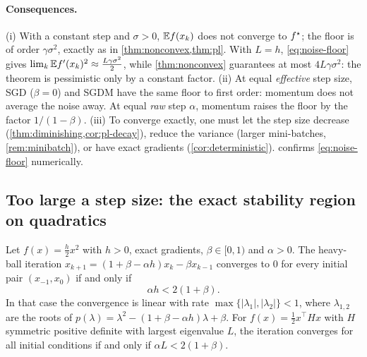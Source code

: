 \paragraph{Consequences.}
(i) With a constant step and $\sigma>0$, $\mathbb{E} f(x_k)$ does not converge to $f^\star$; the floor is
of order $\gamma\sigma^2$, exactly as in \cref{thm:nonconvex,thm:pl}. With $L=h$,
\eqref{eq:noise-floor} gives $\lim_k\mathbb{E} f'(x_k)^2\approx\frac{L\gamma\sigma^2}{2}$, while
\cref{thm:nonconvex} guarantees at most $4L\gamma\sigma^2$: the theorem is pessimistic only by
a constant factor. (ii) At equal \emph{effective} step size, SGD ($\beta=0$) and SGDM have the
same floor to first order: momentum does not average the noise away. At equal \emph{raw}
step $\alpha$, momentum raises the floor by the factor $1/(1-\beta)$. (iii) To converge
exactly, one must let the step size decrease (\cref{thm:diminishing,cor:pl-decay}), reduce
the variance (larger mini-batches, \cref{rem:minibatch}), or have exact gradients
(\cref{cor:deterministic}).  confirms \eqref{eq:noise-floor}
numerically.

\subsection{Too large a step size: the exact stability region on quadratics}

\begin{proposition}\label{prop:quadratic-stability}
Let $f(x)=\frac h2x^2$ with $h>0$, exact gradients, $\beta\in[0,1)$ and $\alpha>0$. The
heavy-ball iteration $x_{k+1}=(1+\beta-\alpha h)x_k-\beta x_{k-1}$ converges to $0$ for
every initial pair $(x_{-1},x_0)$ if and only if
\begin{equation}\label{eq:stability}
  \alpha h<2(1+\beta).
\end{equation}
In that case the convergence is linear with rate $\max\{|\lambda_1|,|\lambda_2|\}<1$,
where $\lambda_{1,2}$ are the roots of $p(\lambda)=\lambda^2-(1+\beta-\alpha h)\lambda+\beta$.
For $f(x)=\frac12x^\top Hx$ with $H$ symmetric positive definite with largest eigenvalue
$L$, the iteration converges for all initial conditions if and only if $\alpha L<2(1+\beta)$.
\end{proposition}

